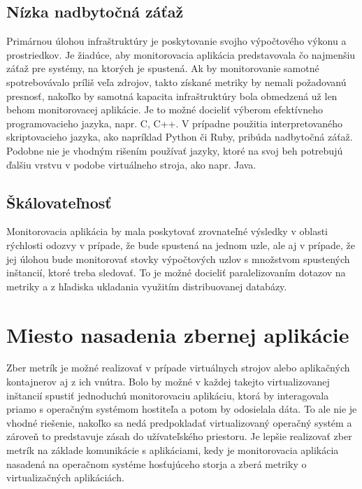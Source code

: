\documentclass[12pt,twoside,color,cover,table]{fithesis3}
\begin{document}
\subsection{Nízka nadbytočná záťaž}
Primárnou úlohou infraštruktúry je poskytovanie svojho výpočtového výkonu a prostriedkov. Je žiadúce, aby monitorovacia aplikácia predstavovala čo najmenšiu záťaž pre systémy, na ktorých je spustená. Ak by monitorovanie
samotné spotrebovávalo príliš veľa zdrojov, takto získané metriky by nemali požadovanú presnosť, nakoľko by samotná kapacita infraštruktúry bola obmedzená už len behom
monitorovacej aplikácie. Je to možné docieliť výberom efektívneho programovacieho jazyka, napr. C, C++. V prípadne použitia interpretovaného skriptovacieho jazyka, ako napríklad Python či Ruby, pribúda 
nadbytočná záťaž. Podobne nie je vhodným rišením používať jazyky, ktoré na svoj beh potrebujú ďalšiu vrstvu v podobe virtuálneho stroja, ako napr. Java.

\subsection{Škálovateľnosť}
Monitorovacia aplikácia by mala poskytovať zrovnateľné výsledky v oblasti rýchlosti odozvy v prípade, že bude spustená na jednom uzle, ale aj v prípade, že jej úlohou bude monitorovať stovky 
výpočtových uzlov s množstvom spustených inštancií, ktoré treba sledovať. To je možné docieliť paralelizovaním dotazov na metriky a z hľadiska ukladania využitím distribuovanej databázy.

\section{Miesto nasadenia zbernej aplikácie}
Zber metrík je možné realizovať v prípade virtuálnych strojov alebo aplikačných kontajnerov aj z ich vnútra. Bolo by možné v každej
takejto virtualizovanej inštancií spustiť jednoduchú monitorovaciu aplikáciu, ktorá by interagovala priamo s operačným systémom hostiteľa a potom by odosielala dáta.
To ale nie je vhodné riešenie, nakoľko sa nedá predpokladať virtualizovaný operačný systém a zároveň to predstavuje zásah do užívateľského
priestoru. Je lepšie realizovať zber metrík na základe komunikácie s aplikáciami, kedy je monitorovacia aplikácia nasadená na operačnom systéme hosťujúceho storja a zberá metriky o virtualizačných aplikáciách.
\end{document}
